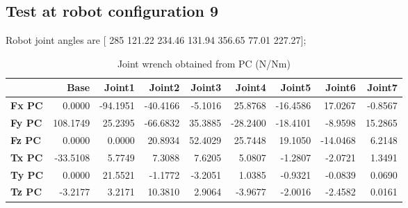 
\subsection{Test at robot configuration 9}
Robot joint angles are  [ 285        121.22        234.46        131.94        356.65         77.01        227.27];

\begin{table}[h!]
	\centering
	\caption{Joint wrench obtained from PC (N/Nm)}
	\label{wrech_PC_Pose9}
	\begin{tabular}{|l|r|r|r|r|r|r|r|r|}
		\hline
		\textbf{}  & \textbf{Base} & \textbf{Joint1}  & \textbf{Joint2}  & \textbf{Joint3}  & \textbf{Joint4}  & \textbf{Joint5}  & \textbf{Joint6}  & \textbf{Joint7} \\ \hline
		\textbf{Fx PC}  & 0.0000        & -94.1951        & -40.4166        & -5.1016        & 25.8768        & -16.4586        & 17.0267        & -0.8567 \\ \hline
		\textbf{Fy PC}  & 108.1749        & 25.2395        & -66.6832        & 35.3885        & -28.2400        & -18.4101        & -8.9598        & 15.2865 \\ \hline
		\textbf{Fz PC}  & 0.0000        & 0.0000        & 20.8934        & 52.4029        & 25.7448        & 19.1050        & -14.0468        & 6.2148 \\ \hline
		\textbf{Tx PC}  & -33.5108        & 5.7749        & 7.3088        & 7.6205        & 5.0807        & -1.2807        & -2.0721        & 1.3491 \\ \hline
		\textbf{Ty PC}  & 0.0000        & 21.5521        & -1.1772        & -3.2051        & 1.0385        & -0.9321        & -0.0839        & 0.0690 \\ \hline
		\textbf{Tz PC}  & -3.2177        & 3.2171        & 10.3810        & 2.9064        & -3.9677        & -2.0016        & -2.4582        & 0.0161 \\ \hline
	\end{tabular}
\end{table}

